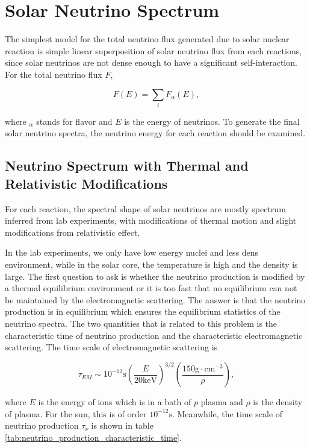 \section{Solar Neutrino Spectrum}


The simplest model for the total neutrino flux generated due to solar nuclear reaction is simple linear superposition of solar neutrino flux from each reactions, since solar neutrinos are not dense enough to have a significant self-interaction. For the total neutrino flux $F$,

\begin{equation}
F(E) = \sum_i F_\alpha (E),
\end{equation}

where ${}_{\alpha}$ stands for flavor and $E$ is the energy of neutrinos. To generate the final solar neutrino spectra, the neutrino energy for each reaction should be examined.

\subsection{Neutrino Spectrum with Thermal and Relativistic Modifications}

For each reaction, the spectral shape of solar neutrinos are mostly spectrum inferred from lab experiments, with modifications of thermal motion and slight modifications from relativistic effect.\cite{Bahcall1991} 

In the lab experiments, we only have low energy nuclei and less dens environment, while in the solar core, the temperature is high and the density is large. The first question to ask is whether the neutrino production is modified by a thermal equilibrium environment or it is too fast that no equilibrium can not be maintained by the electromagnetic scattering. The answer is that the neutrino production is in equilibrium which ensures the equilibrium statistics of the neutrino spectra.\cite{Bahcall1991} The two quantities that is related to this problem is the characteristic time of neutrino production and the characteristic electromagnetic scattering. The time scale of electromagnetic scattering is \cite{Bahcall1991}

\begin{equation}
\tau_{EM} \sim 10^{-12} \mathrm{s} \left( \frac{E}{20\mathrm{keV}} \right)^{3/2}\left( \frac{150 \mathrm{g \cdot cm^{-3}} }{\rho} \right),
\end{equation}

where $E$ is the energy of ions which is in a bath of $p$ plasma and $\rho$ is the density of plasma. For the sun, this is of order $10^{-12}\mathrm{s}$. Meanwhile, the time scale of neutrino production $\tau_{\nu}$ is shown in table \ref{tab:neutrino_production_characteristic_time}.


